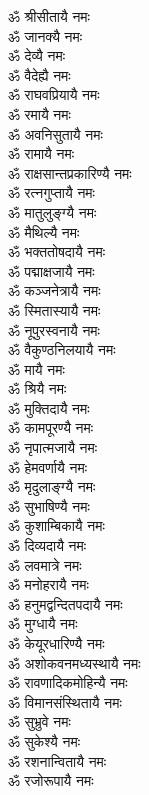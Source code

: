 \begin{multicols}{2}
\begin{flushleft}
ॐ श्रीसीतायै नमः\\
ॐ जानक्यै नमः\\
ॐ देव्यै नमः\\
ॐ वैदेह्यै नमः\\
ॐ राघवप्रियायै नमः\\
ॐ रमायै नमः\\
ॐ अवनिसुतायै नमः\\
ॐ रामायै नमः\\
ॐ राक्षसान्तप्रकारिण्यै नमः\\
ॐ रत्नगुप्तायै नमः\hfill{}\\
ॐ मातुलुङ्ग्यै नमः\\
ॐ मैथिल्यै नमः\\
ॐ भक्ततोषदायै नमः\\
ॐ पद्माक्षजायै नमः\\
ॐ कञ्जनेत्रायै नमः\\
ॐ स्मितास्यायै नमः\\
ॐ नूपुरस्वनायै नमः\\
ॐ वैकुण्ठनिलयायै नमः\\
ॐ मायै नमः\\
ॐ श्रियै नमः\hfill{}\\
ॐ मुक्तिदायै नमः\\
ॐ कामपूरण्यै नमः\\
ॐ नृपात्मजायै नमः\\
ॐ हेमवर्णायै नमः\\
ॐ मृदुलाङ्ग्यै नमः\\
ॐ सुभाषिण्यै नमः\\
ॐ कुशाम्बिकायै नमः\\
ॐ दिव्यदायै नमः\\
ॐ लवमात्रे नमः\\
ॐ मनोहरायै नमः\hfill{}\\
ॐ हनुमद्वन्दितपदायै नमः\\
ॐ मुग्धायै नमः\\
ॐ केयूरधारिण्यै नमः\\
ॐ अशोकवनमध्यस्थायै नमः\\
ॐ रावणादिकमोहिन्यै नमः\\
ॐ विमानसंस्थितायै नमः\\
ॐ सुभ्रुवे नमः\\
ॐ सुकेश्यै नमः\\
ॐ रशनान्वितायै नमः\\
ॐ रजोरूपायै नमः\hfill{}\\

\end{flushleft}
\end{multicols}
